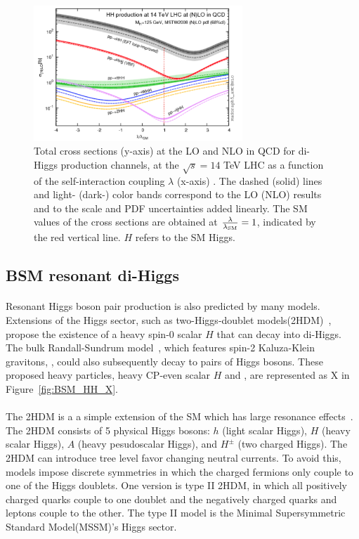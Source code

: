 \begin{figure}[h!]
  \centering
  \captionsetup{justification=centering}
  \includegraphics[width=0.7\textwidth]{figures/theory/HH_lam}
  \caption{Total cross sections (y-axis) at the LO and NLO in QCD for di-Higgs production channels, at the $\sqrt{s} = 14$ TeV LHC as a function of the self-interaction coupling $\lambda$ (x-axis) . The dashed (solid) lines and light- (dark-) color bands correspond to the LO (NLO) results and to the scale and PDF uncertainties added linearly. The SM values of the cross sections are obtained at $\frac{\rm \lambda}{\rm \lambda_{\rm SM}} = 1$, indicated by the red vertical line. $H$ refers to the SM Higgs.}
  \label{fig:SM_HH_lam}
\end{figure}

\subsection{BSM resonant di-Higgs}
\paragraph{}
Resonant Higgs boson pair production is also predicted by many models. Extensions of the Higgs sector, such as two-Higgs-doublet models(2HDM)~\cite{PhysRevD.8.1226, Branco:2011iw}, propose the existence of a heavy spin-0 scalar $H$ that can decay into di-Higgs. The bulk Randall-Sundrum model~\cite{Agashe:2007zd, Fitzpatrick}, which features spin-2 Kaluza-Klein gravitons, \Grav, could also subsequently decay to pairs of Higgs bosons. These proposed heavy particles, heavy CP-even scalar $H$ and \Grav, are represented as X in Figure~\ref{fig:BSM_HH_X}.

\paragraph{}
The 2HDM is a a simple extension of the SM which has large resonance effects~\cite{LHCYellow}. 
The 2HDM consists of 5 physical Higgs bosons: $h$ (light scalar Higgs), $H$ (heavy scalar Higgs), $A$ (heavy pesudoscalar Higgs), and $H^{\pm}$ (two charged Higgs). 
The 2HDM can introduce tree level favor changing neutral currents. 
To avoid this, models impose discrete symmetries in which the charged fermions only couple to one of the Higgs doublets.
One version is type II 2HDM, in which all positively charged quarks couple to one doublet and the negatively charged quarks and leptons couple to the other. 
The type II model is the Minimal Supersymmetric Standard Model(MSSM)'s Higgs sector.

